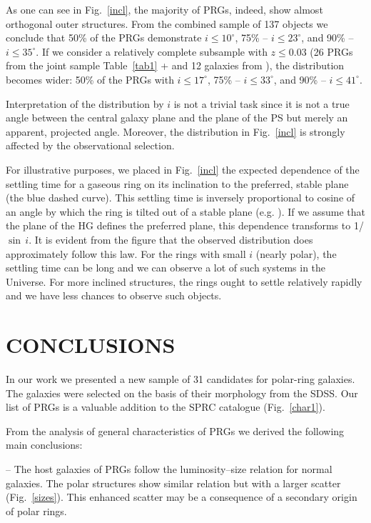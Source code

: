 \documentclass[a4paper,fleqn,usenatbib]{mnras}
\begin{document}
As one can see in Fig.~\ref{incl}, the majority of PRGs, indeed, show almost orthogonal
outer structures. From the combined sample of 137 objects we conclude that
50\% of the PRGs demonstrate $i \leq 10^{\circ}$, 75\% -- $i \leq 23^{\circ}$,
and 90\% -- $i \leq 35^{\circ}$. If we consider a relatively complete subsample
with $z \leq 0.03$ (26 PRGs from the joint sample 
Table~\ref{tab1}  + \citealt{smirmois2013} and 12 
galaxies from \citealt{whit1991}), the distribution becomes wider: 
50\% of the PRGs with $i \leq 17^{\circ}$, 75\% -- $i \leq 33^{\circ}$, and 90\% --
$i \leq 41^{\circ}$.

Interpretation of the distribution by $i$ is not a trivial task since
it is not a true angle between the central galaxy plane and the plane of the PS 
but merely an apparent, projected angle. Moreover, the distribution in
Fig.~\ref{incl} is strongly affected by the observational selection. 

For illustrative purposes, we placed in Fig.~\ref{incl} the expected dependence
of the settling time for a gaseous ring on its inclination to the
preferred, stable plane (the blue dashed curve). This settling time
is inversely proportional to cosine of an angle by which the ring is tilted out of
a stable plane (e.g. \citealt{tohline1990}). If we assume that the plane 
of the HG defines the preferred plane, this dependence
transforms to 1/$\sin$\,$i$. It is evident from the figure that the observed
distribution does approximately follow this law.  For the rings with
small $i$ (nearly polar), the settling time can be long and we can observe 
a lot of such systems in the Universe. For more inclined structures, the rings
ought to settle relatively rapidly and we have less chances to observe such objects.

\section{CONCLUSIONS}

In our work we presented a new sample of 31 candidates for polar-ring galaxies. 
The galaxies were selected on the basis of their morphology from the SDSS.
Our list of PRGs is a valuable addition to the SPRC catalogue (Fig.~\ref{char1}). 

From the analysis of general characteristics of PRGs we derived the following 
main conclusions:

-- The host galaxies of PRGs follow the luminosity--size relation for normal
galaxies. The polar structures show similar relation but with a larger 
scatter (Fig.~\ref{sizes}). This enhanced scatter may be a consequence of a secondary 
origin of polar rings.
\end{document}
